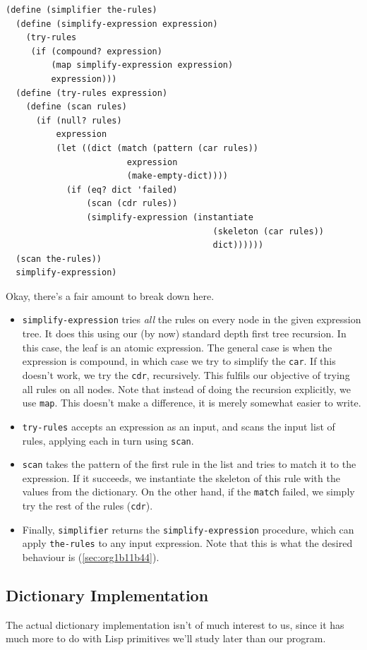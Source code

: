 \documentclass[9pt]{report}
\begin{document}
\begin{verbatim}
(define (simplifier the-rules)
  (define (simplify-expression expression)
    (try-rules
     (if (compound? expression)
         (map simplify-expression expression)
         expression)))
  (define (try-rules expression)
    (define (scan rules)
      (if (null? rules)
          expression
          (let ((dict (match (pattern (car rules))
                        expression
                        (make-empty-dict))))
            (if (eq? dict 'failed)
                (scan (cdr rules))
                (simplify-expression (instantiate
                                         (skeleton (car rules))
                                         dict))))))
  (scan the-rules))
  simplify-expression)
\end{verbatim}

Okay, there's a fair amount to break down here.
\begin{itemize}
\item \texttt{simplify-expression} tries \emph{all} the rules on every node in the
given expression tree. It does this using our (by now) standard
depth first tree recursion. In this case, the leaf is an atomic
expression. The general case is when the expression is compound,
in which case we try to simplify the \texttt{car}. If this doesn't
work, we try the \texttt{cdr}, recursively. This fulfils our objective
of trying all rules on all nodes. Note that instead of doing the
recursion explicitly, we use \texttt{map}. This doesn't make a
difference, it is merely somewhat easier to write.
\item \texttt{try-rules} accepts an expression as an input, and scans the
input list of rules, applying each in turn using \texttt{scan}.
\item \texttt{scan} takes the pattern of the first rule in the list and tries
to match it to the expression. If it succeeds, we instantiate
the skeleton of this rule with the values from the dictionary.
On the other hand, if the \texttt{match} failed, we simply try the rest
of the rules (\texttt{cdr}).
\item Finally, \texttt{simplifier} returns the \texttt{simplify-expression}
procedure, which can apply \texttt{the-rules} to any input expression.
Note that this is what the desired behaviour is (\ref{sec:org1b11b44}).
\end{itemize}

\subsection{Dictionary Implementation}
\label{sec:org042ecd0}
The actual dictionary implementation isn't of much interest to us,
since it has much more to do with Lisp primitives we'll study
later than our program.
\end{document}
